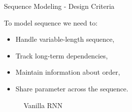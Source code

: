 \begin{frame} {Sequence Modeling - Design Criteria}

To model sequence we need to:


  \begin{itemize}
    \item Handle variable-length sequence,
    \item Track long-term dependencies,
    \item Maintain information about order,
    \item Share parameter across the sequence.
  \end{itemize}

  \begin{figure}
      \centering
      \caption{\footnotesize {Vanilla RNN}}
  \end{figure}

\end{frame}

